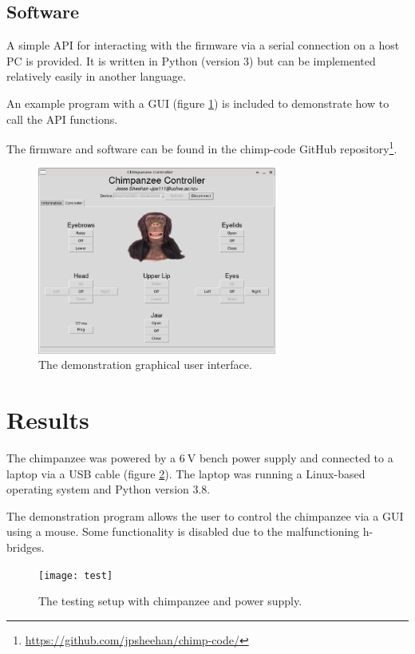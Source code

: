 \documentclass[12pt]{article} %
\begin{document}
\subsection{Software}

A simple API for interacting with the firmware via a serial connection on a host PC is provided.
It is written in Python (version 3) but can be implemented relatively easily in another language.

An example program with a GUI (figure \ref{fig:gui}) is included to demonstrate how to call the API functions.

The firmware and software can be found in the chimp-code GitHub repository\footnote{\url{https://github.com/jpsheehan/chimp-code/}}.

\begin{figure}[H]
	\center
	\includegraphics[width=0.7\textwidth]{gui}
	\caption{The demonstration graphical user interface.}
	\label{fig:gui}
\end{figure}

\section{Results}

The chimpanzee was powered by a $\SI{6}{\volt}$ bench power supply and connected to a laptop via a USB cable (figure \ref{fig:test}).
The laptop was running a Linux-based operating system and Python version 3.8.

The demonstration program allows the user to control the chimpanzee via a GUI using a mouse. Some functionality is disabled due to the malfunctioning h-bridges.

\begin{figure}[H]
	\center
	\texttt{[image: test]}
	\caption{The testing setup with chimpanzee and power supply.}
	\label{fig:test}
\end{figure}
\end{document}

